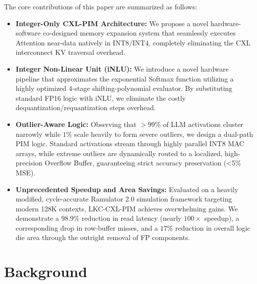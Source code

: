 \documentclass[10pt,conference]{IEEEtran}
\begin{document}
The core contributions of this paper are summarized as follows:
\begin{itemize}
    \item \textbf{Integer-Only CXL-PIM Architecture:} We propose a novel hardware-software co-designed memory expansion system that seamlessly executes Attention near-data natively in INT8/INT4, completely eliminating the CXL interconnect KV traversal overhead.
    \item \textbf{Integer Non-Linear Unit (iNLU):} We introduce a novel hardware pipeline that approximates the exponential Softmax function utilizing a highly optimized 4-stage shifting-polynomial evaluator. By substituting standard FP16 logic with iNLU, we eliminate the costly dequantization/requantization steps overhead.
    \item \textbf{Outlier-Aware Logic:} Observing that $>99\%$ of LLM activations cluster narrowly while $1\%$ scale heavily to form severe outliers, we design a dual-path PIM logic. Standard activations stream through highly parallel INT8 MAC arrays, while extreme outliers are dynamically routed to a localized, high-precision Overflow Buffer, guaranteeing strict accuracy preservation (\textless 5\% MSE).
    \item \textbf{Unprecedented Speedup and Area Savings:} Evaluated on a heavily modified, cycle-accurate Ramulator 2.0 simulation framework targeting modern 128K contexts, LKC-CXL-PIM achieves overwhelming gains. We demonstrate a $98.9\%$ reduction in read latency (nearly $100\times$ speedup), a corresponding drop in row-buffer misses, and a $17\%$ reduction in overall logic die area through the outright removal of FP components.
\end{itemize}


\section{Background}
\end{document}
